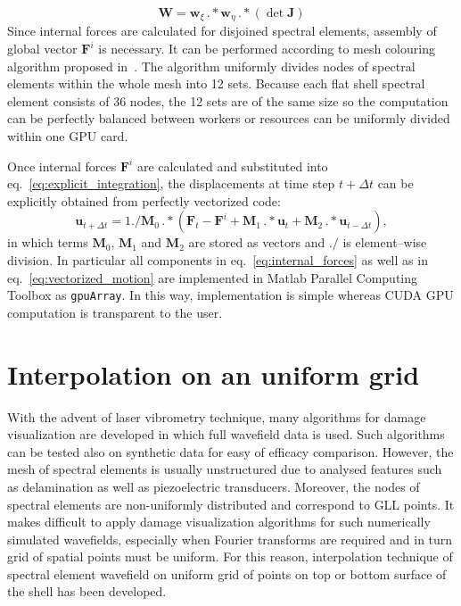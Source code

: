 \documentclass[preprint,12pt]{elsarticle}
\renewcommand{\vec}[1]{\mathbf{#1}}
\begin{document}
	\begin{equation}
	\vec{W} = \vec{w}_{\xi}\,.*\vec{w}_{\eta}\,.*\left(\det\vec{J}\right)
	\end{equation}
	Since internal forces are calculated for disjoined spectral elements, assembly of global vector $\vec{F}^i$ is necessary. It can be performed according to mesh colouring algorithm proposed in~\cite{Kudela2016}. The algorithm uniformly divides nodes of spectral elements within the whole mesh into 12 sets. Because each flat shell spectral element consists of 36 nodes, the 12 sets are of the same size so the computation can be perfectly balanced between workers or resources can be uniformly divided within one GPU card.
	
	Once internal forces $\vec{F}^i$ are calculated and substituted into eq.~\ref{eq:explicit_integration}, the displacements at time step $t+\Delta t$ can be explicitly obtained from perfectly vectorized code:
	\begin{equation}
	\vec{u}_{t+\Delta t}=1./\vec{M}_0\, .*\left(\vec{F}_t - \vec{F}^i +\vec{M}_1 \, .* \vec{u}_t +\vec{M}_2 \, .* \vec{u}_{t-\Delta t}\right),
	\label{eq:vectorized_motion}
	\end{equation} 
	in which terms $\vec{M}_0$, $\vec{M}_1$ and $\vec{M}_2$ are stored as vectors and $./$ is element--wise division. In particular all components in eq.~\ref{eq:internal_forces} as well as in eq.~\ref{eq:vectorized_motion} are implemented in Matlab Parallel Computing Toolbox as \verb|gpuArray|. In this way, implementation is simple whereas CUDA GPU computation is transparent to the user.
	\section{Interpolation on an uniform grid}
	With the advent of laser vibrometry technique, many algorithms for damage visualization  are developed in which full wavefield data is used. Such algorithms can be tested also on synthetic data for easy of efficacy comparison. However, the mesh of spectral elements is usually unstructured due to analysed features such as delamination as well as piezoelectric transducers. Moreover, the nodes of spectral elements are non-uniformly distributed and correspond to GLL points. It makes difficult to apply damage visualization algorithms for such numerically simulated wavefields, especially when Fourier transforms are required and in turn grid of spatial points must be uniform. For this reason, interpolation technique of spectral element wavefield on uniform grid of points on top or bottom surface of the shell has been developed. 
	
\end{document}
